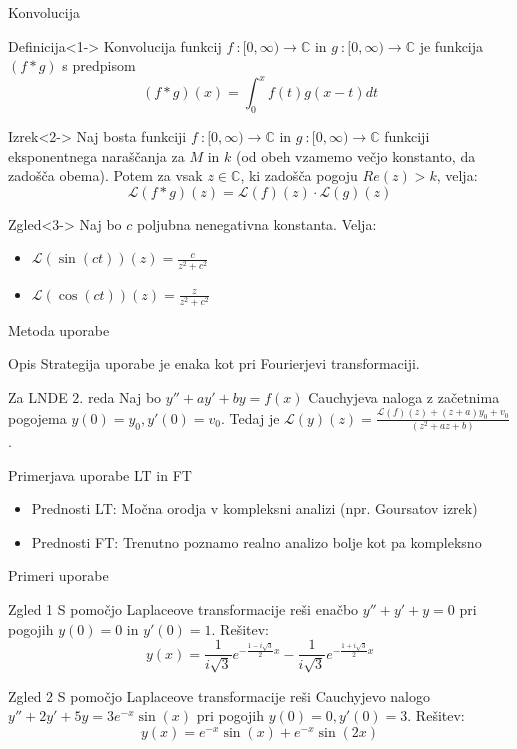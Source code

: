 \documentclass[t, 8pt]{beamer} %
\newcommand{\mth}[1]{\ensuremath{\mathbb{#1}}}
\newcommand{\C}{\mth{C}}
\newcommand{\map}[3]{\ensuremath{{#1}~: {#2} \rightarrow {#3}}}
\begin{document}
		\begin{frame}{Konvolucija}
			\begin{block}{Definicija}<1->
				Konvolucija funkcij $\map{f}{[0,\infty)}{\C}$ in $\map{g}{[0,\infty)}{\C}$ je funkcija $(f*g)$ s predpisom $$(f*g)(x) = \int_{0}^{x} f(t)g(x-t)dt$$
			\end{block}
			\begin{block}{Izrek}<2->
				Naj bosta funkciji $\map{f}{[0,\infty)}{\C}$ in $\map{g}{[0,\infty)}{\C}$ funkciji eksponentnega naraščanja za $M$ in $k$ (od obeh vzamemo večjo konstanto, da zadošča obema). Potem za vsak $z\in\C$, ki zadošča pogoju $Re(z) > k$, velja: $$\mathcal{L}(f*g)(z) = \mathcal{L}(f)(z)\cdot\mathcal{L}(g)(z)$$
			\end{block}
			\begin{block}{Zgled}<3->
				Naj bo $c$ poljubna nenegativna konstanta. Velja: \begin{itemize}
					\item $\mathcal{L}(\sin(ct))(z) = \frac{c}{z^2 + c^2}$
					\item $\mathcal{L}(\cos(ct))(z) = \frac{z}{z^2 + c^2}$
				\end{itemize}
			\end{block}
		\end{frame}
		
		\begin{frame}{Metoda uporabe}
			\begin{block}{Opis}
				Strategija uporabe je enaka kot pri Fourierjevi transformaciji.
			\end{block}
			\begin{block}{Za LNDE $2.$ reda}
				Naj bo $y'' + ay' + by = f(x)$ Cauchyjeva naloga z začetnima pogojema $y(0) = y_0, y'(0) = v_0$. Tedaj je $\mathcal{L}(y)(z)= \frac{\mathcal{L}(f)(z) +(z+a)y_0 + v_0}{(z^2 + az + b)}$.
			\end{block}
			\begin{block}{Primerjava uporabe LT in FT}
				\begin{itemize}
					\item Prednosti LT: Močna orodja v kompleksni analizi (npr. Goursatov izrek)
					\item Prednosti FT: Trenutno poznamo realno analizo bolje kot pa kompleksno
				\end{itemize}
			\end{block}
		\end{frame}
		
		\begin{frame}{Primeri uporabe}
			\begin{block}{Zgled 1}
				S pomočjo Laplaceove transformacije reši enačbo $y'' + y' + y = 0$ pri pogojih $y(0) = 0$ in $y'(0) = 1$.
				Rešitev: $$y(x) = \frac{1}{i\sqrt{3}}e^{-\frac{1 - i\sqrt{3}}{2}x}-\frac{1}{i\sqrt{3}}e^{-\frac{1 + i\sqrt{3}}{2}x}$$
			\end{block}
			\begin{block}{Zgled 2}
				S pomočjo Laplaceove transformacije reši Cauchyjevo nalogo $y'' + 2y' + 5y = 3e^{-x}\sin(x)$ pri pogojih $y(0) = 0, y'(0)=3$. Rešitev: $$y(x) = e^{-x}\sin(x) + e^{-x}\sin(2x)$$
			\end{block}
		\end{frame}
		
\end{document}
